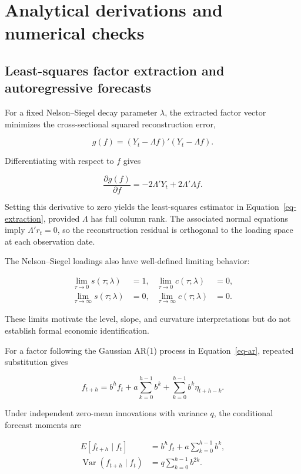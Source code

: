 \documentclass[
  12pt,
  letterpaper,
  DIV=11,
  numbers=noendperiod]{scrreprt}
\begin{document}
\appendix

\chapter{Analytical derivations and numerical
checks}\label{sec-appendix}

\section{Least-squares factor extraction and autoregressive
forecasts}\label{least-squares-factor-extraction-and-autoregressive-forecasts}

For a fixed Nelson--Siegel decay parameter \(\lambda\), the extracted
factor vector minimizes the cross-sectional squared reconstruction
error,

\[
g(f)=(Y_t-\Lambda f)'(Y_t-\Lambda f).
\]

Differentiating with respect to \(f\) gives

\[
\frac{\partial g(f)}{\partial f}
=-2\Lambda'Y_t+2\Lambda'\Lambda f.
\]

Setting this derivative to zero yields the least-squares estimator in
Equation~\ref{eq-extraction}, provided \(\Lambda\) has full column rank.
The associated normal equations imply \(\Lambda'r_t=0\), so the
reconstruction residual is orthogonal to the loading space at each
observation date.

The Nelson--Siegel loadings also have well-defined limiting behavior:

\[
\begin{aligned}
\lim_{\tau\to0}s(\tau;\lambda)&=1,
&\lim_{\tau\to0}c(\tau;\lambda)&=0,\\
\lim_{\tau\to\infty}s(\tau;\lambda)&=0,
&\lim_{\tau\to\infty}c(\tau;\lambda)&=0.
\end{aligned}
\]

These limits motivate the level, slope, and curvature interpretations
but do not establish formal economic identification.

For a factor following the Gaussian AR(1) process in
Equation~\ref{eq-ar}, repeated substitution gives

\[
f_{t+h}
=b^hf_t+a\sum_{k=0}^{h-1}b^k
+\sum_{k=0}^{h-1}b^k\eta_{t+h-k}.
\]

Under independent zero-mean innovations with variance \(q\), the
conditional forecast moments are

\[
\begin{aligned}
E[f_{t+h}\mid f_t]
&=b^hf_t+a\sum_{k=0}^{h-1}b^k,\\
\operatorname{Var}(f_{t+h}\mid f_t)
&=q\sum_{k=0}^{h-1}b^{2k}.
\end{aligned}
\]
\end{document}
